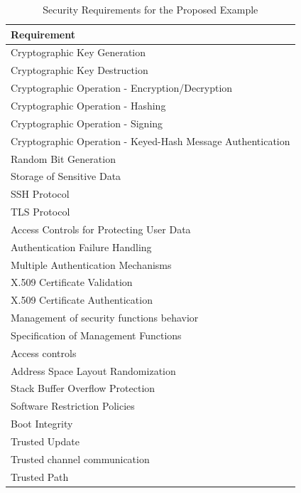\begin{table}[ht]
    \centering
    \begin{tabular}{||l||} 
     \hline
     \rowcolor{Gray}
     \textbf{Requirement} \\ [0.5ex] 
     \hline\hline
     Cryptographic Key Generation \\ 
     \hline
     Cryptographic Key Destruction \\
     \hline
     Cryptographic Operation - Encryption/Decryption \\
     \hline
     Cryptographic Operation - Hashing \\
     \hline
     Cryptographic Operation - Signing \\
     \hline
     Cryptographic Operation - Keyed-Hash Message Authentication\\
     \hline
     Random Bit Generation\\
     \hline
     Storage of Sensitive Data\\
     \hline
     SSH Protocol\\
     \hline
     TLS Protocol\\
     \hline
     Access Controls for Protecting User Data\\
     \hline
     Authentication Failure Handling\\
     \hline
     Multiple Authentication Mechanisms\\
     \hline
     X.509 Certificate Validation\\
     \hline
     X.509 Certificate Authentication\\
     \hline
     Management of security functions behavior\\
     \hline
     Specification of Management Functions\\
     \hline
     Access controls\\
     \hline
     Address Space Layout Randomization\\
     \hline
     Stack Buffer Overflow Protection\\
     \hline
    Software Restriction Policies\\
     \hline
     Boot Integrity\\
     \hline
     Trusted Update\\
     \hline
     Trusted channel communication\\
     \hline
     Trusted Path \\ [0.5ex]
     \hline
    \end{tabular}
    \caption{Security Requirements for the Proposed Example}
    \label{tab:SR}
\end{table}


